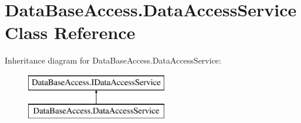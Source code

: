 \hypertarget{classDataBaseAccess_1_1DataAccessService}{}\section{Data\+Base\+Access.\+Data\+Access\+Service Class Reference}
\label{classDataBaseAccess_1_1DataAccessService}
Inheritance diagram for Data\+Base\+Access.\+Data\+Access\+Service\+:\begin{figure}[H]
\begin{center}
\leavevmode
\includegraphics[height=2.000000cm]{dc/d4e/classDataBaseAccess_1_1DataAccessService}
\end{center}
\end{figure}
